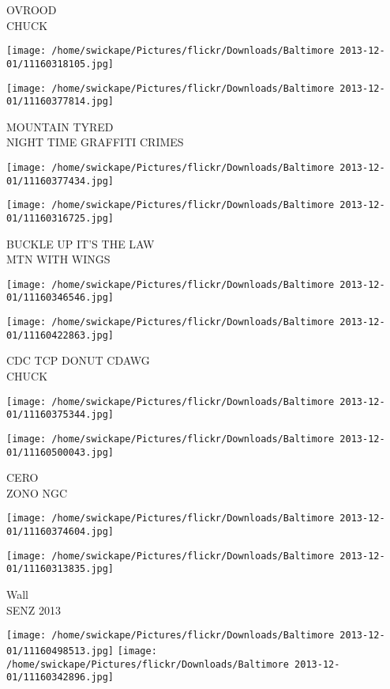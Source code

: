 \documentclass[10pt,letterpaper]{article}
\begin{document}
OVROOD\\
CHUCK
\pagebreak

\texttt{[image: /home/swickape/Pictures/flickr/Downloads/Baltimore 2013-12-01/11160318105.jpg]}

\vspace{0.25in}
\texttt{[image: /home/swickape/Pictures/flickr/Downloads/Baltimore 2013-12-01/11160377814.jpg]}

MOUNTAIN TYRED\\
NIGHT TIME GRAFFITI CRIMES
\pagebreak

\texttt{[image: /home/swickape/Pictures/flickr/Downloads/Baltimore 2013-12-01/11160377434.jpg]}

\vspace{0.25in}
\texttt{[image: /home/swickape/Pictures/flickr/Downloads/Baltimore 2013-12-01/11160316725.jpg]}

BUCKLE UP IT'S THE LAW\\
MTN WITH WINGS
\pagebreak

\texttt{[image: /home/swickape/Pictures/flickr/Downloads/Baltimore 2013-12-01/11160346546.jpg]}

\vspace{0.25in}
\texttt{[image: /home/swickape/Pictures/flickr/Downloads/Baltimore 2013-12-01/11160422863.jpg]}

CDC TCP DONUT CDAWG\\
CHUCK
\pagebreak

\texttt{[image: /home/swickape/Pictures/flickr/Downloads/Baltimore 2013-12-01/11160375344.jpg]}

\vspace{0.25in}
\texttt{[image: /home/swickape/Pictures/flickr/Downloads/Baltimore 2013-12-01/11160500043.jpg]}

CERO\\
ZONO NGC
\pagebreak

\texttt{[image: /home/swickape/Pictures/flickr/Downloads/Baltimore 2013-12-01/11160374604.jpg]}

\vspace{0.25in}
\texttt{[image: /home/swickape/Pictures/flickr/Downloads/Baltimore 2013-12-01/11160313835.jpg]}

Wall\\
SENZ 2013
\pagebreak

\texttt{[image: /home/swickape/Pictures/flickr/Downloads/Baltimore 2013-12-01/11160498513.jpg]}
\texttt{[image: /home/swickape/Pictures/flickr/Downloads/Baltimore 2013-12-01/11160342896.jpg]}
\end{document}
